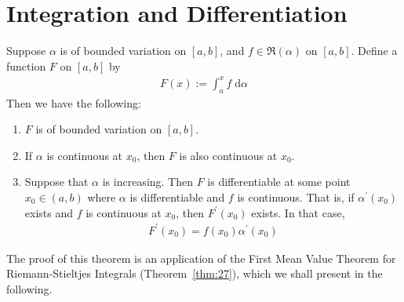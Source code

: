 \documentclass[thmcnt=section, 12pt]{elegantbook}
\begin{document}

\section{Integration and Differentiation}


\begin{theorem} \label{thm:42}
    Suppose $\alpha$ is of bounded variation on $[a, b]$, and $f \in \mathfrak{R}(\alpha)$ on $[a, b]$. Define a function $F$ on $[a, b]$ by
    \begin{align*}
        F(x) := \int_a^x f \; \mathrm{d}\alpha
    \end{align*}
    Then we have the following:
    \begin{enumerate}
        \item $F$ is of bounded variation on $[a, b]$.
        \item If $\alpha$ is continuous at $x_0$, then $F$ is also continuous at $x_0$.
        \item Suppose that $\alpha$ is increasing. Then $F$ is differentiable at some point $x_0 \in (a, b)$ where $\alpha$ is differentiable and $f$ is continuous. That is, if $\alpha^\prime(x_0)$ exists and $f$ is continuous at $x_0$, then $F^\prime(x_0)$ exists. In that case,
        \begin{align*}
            F^\prime(x_0) = f(x_0) \alpha^\prime(x_0)
        \end{align*}
    \end{enumerate}
\end{theorem}

\par The proof of this theorem is an application of the First Mean Value Theorem for Riemann-Stieltjes Integrals (Theorem~\ref{thm:27}), which we shall present in the following.
\end{document}
